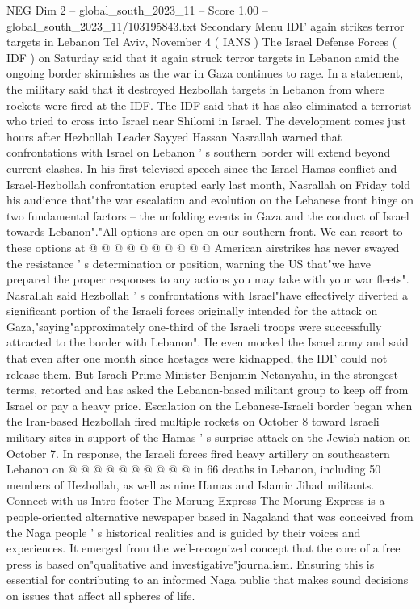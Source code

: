 \begin{textsample}{NEG Dim 2 – global\_south\_2023\_11 – Score 1.00 – global\_south\_2023\_11/103195843.txt}  \label{ex:f2_neg_353}
Secondary Menu IDF again strikes terror targets in Lebanon Tel Aviv, November 4 ( IANS ) The Israel Defense Forces ( IDF ) on Saturday said that it again struck terror targets in Lebanon amid the ongoing border skirmishes as the war in Gaza continues to rage.
In a statement, the military said that it destroyed Hezbollah targets in Lebanon from where rockets were fired at the IDF.
The IDF said that it has also eliminated a terrorist who tried to cross into Israel near Shilomi in Israel.
The development comes just hours after Hezbollah Leader Sayyed Hassan Nasrallah warned that confrontations with Israel on Lebanon ' s southern border will extend beyond current clashes.
In his first televised speech since the Israel-Hamas conflict and Israel-Hezbollah confrontation erupted early last month, Nasrallah on Friday told his audience that"the war escalation and evolution on the Lebanese front hinge on two fundamental factors -- the unfolding events in Gaza and the conduct of Israel towards Lebanon"."All options are open on our southern front.
We can resort to these options at @ @ @ @ @ @ @ @ @ @ American airstrikes has never swayed the resistance ' s determination or position, warning the US that"we have prepared the proper responses to any actions you may take with your war fleets".
Nasrallah said Hezbollah ' s confrontations with Israel"have effectively diverted a significant portion of the Israeli forces originally intended for the attack on Gaza,"saying"approximately one-third of the Israeli troops were successfully attracted to the border with Lebanon".
He even mocked the Israel army and said that even after one month since hostages were kidnapped, the IDF could not release them.
But Israeli Prime Minister Benjamin Netanyahu, in the strongest terms, retorted and has asked the Lebanon-based militant group to keep off from Israel or pay a heavy price.
Escalation on the Lebanese-Israeli border began when the Iran-based Hezbollah fired multiple rockets on October 8 toward Israeli military sites in support of the Hamas ' s surprise attack on the Jewish nation on October 7.
In response, the Israeli forces fired heavy artillery on southeastern Lebanon on @ @ @ @ @ @ @ @ @ @ in 66 deaths in Lebanon, including 50 members of Hezbollah, as well as nine Hamas and Islamic Jihad militants.
Connect with us Intro footer The Morung Express The Morung Express is a people-oriented alternative newspaper based in Nagaland that was conceived from the Naga people ' s historical realities and is guided by their voices and experiences.
It emerged from the well-recognized concept that the core of a free press is based on"qualitative and investigative"journalism.
Ensuring this is essential for contributing to an informed Naga public that makes sound decisions on issues that affect all spheres of life.

\end{textsample}
